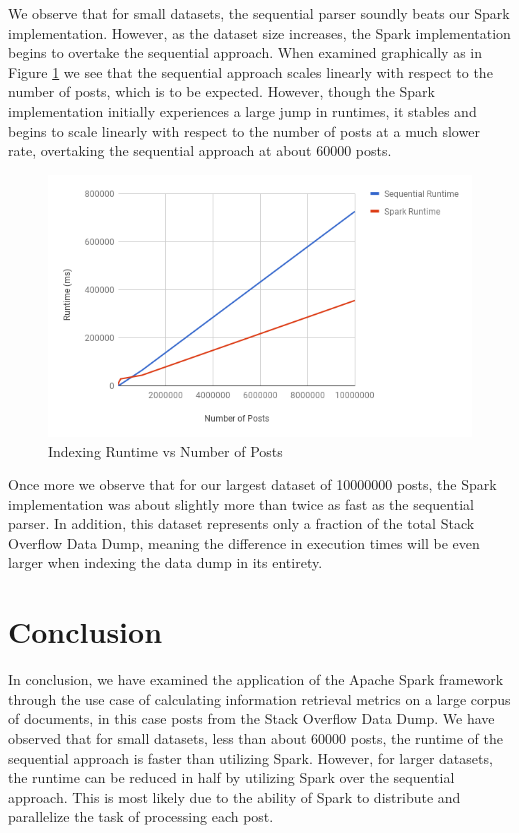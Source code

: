 \documentclass[conference]{IEEEtran}
\newcommand{\so}{Stack Overflow\xspace}
\begin{document}
We observe that for small datasets, the sequential parser soundly beats our Spark implementation. However, as the dataset size increases, the Spark implementation begins to overtake the sequential approach.  When examined graphically as in Figure \ref{fig:graph} we see that the sequential approach scales linearly with respect to the number of posts, which is to be expected. However, though the Spark implementation initially experiences a large jump in runtimes, it stables and begins to scale linearly with respect to the number of posts at a much slower rate, overtaking the sequential approach at about 60000 posts.

\begin{figure}[ht]
	\caption{Indexing Runtime vs Number of Posts}
	\label{fig:graph}
	\includegraphics[width=\linewidth]{chart.png}
\end{figure}

Once more we observe that for our largest dataset of 10000000 posts, the Spark implementation was about slightly more than twice as fast as the sequential parser.  In addition, this dataset represents only a fraction of the total \so Data Dump, meaning the difference in execution times will be even larger when indexing the data dump in its entirety.

\section{Conclusion}
In conclusion, we have examined the application of the Apache Spark framework through the use case of calculating information retrieval metrics on a large corpus of documents, in this case posts from the \so Data Dump.  We have observed that for small datasets, less than about 60000 posts, the runtime of the sequential approach is faster than utilizing Spark.  However, for larger datasets, the runtime can be reduced in half by utilizing Spark over the sequential approach.  This is most likely due to the ability of Spark to distribute and parallelize the task of processing each post.
	
\end{document}
